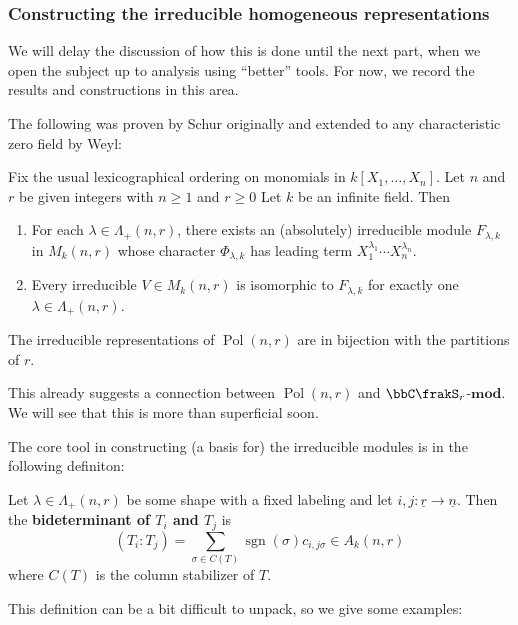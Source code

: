 \documentclass[12pt]{article}
\DeclareMathOperator{\Pol}{Pol}
\begin{document}
		\subsubsection{Constructing the irreducible homogeneous representations}
		We will delay the discussion of how this is done until the next part, when we open the subject up to 
		analysis using ``better'' tools. For now, we record the results and constructions in this area.

		The following was proven by Schur originally and extended to any characteristic zero field by Weyl:
		\begin{thm}
			Fix the usual lexicographical ordering on monomials in $k[X_1,\dots,X_n]$. Let $n$ and $r$ be given integers with $n\ge 1$ and $r\ge 0$ Let $k$ be an infinite field. Then 
			\begin{enumerate}
				\item For each $\lambda\in\Lambda_+(n,r)$, there exists an (absolutely) irreducible module $F_{\lambda,k}$
				in $M_k(n,r)$ whose character $\Phi_{\lambda,k}$ has leading term $X_1^{\lambda_1}\cdots X_n^{\lambda_n}$.
				\item Every irreducible $V\in M_k(n,r)$ is isomorphic to $F_{\lambda,k}$ for exactly one $\lambda\in \Lambda_+(n,r)$.
			\end{enumerate}
		\end{thm}
		\begin{cor}
			The irreducible representations of $\Pol(n,r)$ are in bijection with the partitions of $r$.
		\end{cor}
		\begin{rmk}
			This already suggests a connection between $\Pol(n,r)$ and $\bbC\frakS_r$-$\mathbf{mod}$. We will see 
			that this is more than superficial soon.
		\end{rmk}
		The core tool in constructing (a basis for) the irreducible modules is in the following definiton:
		\begin{defn}
			Let $\lambda\in\Lambda_+(n,r)$ be some shape with a fixed labeling and let $i,j:\underline r\to\underline n$. Then the \textbf{bideterminant of $T_i$ and $T_j$}
			is 
			\[(T_i:T_j)=\sum_{\sigma\in C(T)}\operatorname{sgn}(\sigma)c_{i,j\sigma}\in A_k(n,r)\]
			where $C(T)$ is the column stabilizer of $T$.
		\end{defn}
		This definition can be a bit difficult to unpack, so we give some examples:
\end{document}
